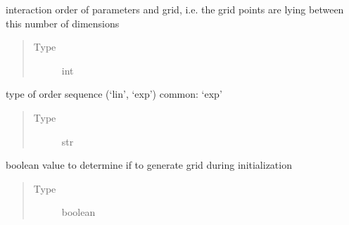 \documentclass[letterpaper,10pt,english,openany,oneside]{sphinxmanual}
\begin{document}
\begin{fulllineitems}
\begin{fulllineitems}
\begin{quote}
\begin{description}
\end{description}\end{quote}

\end{fulllineitems}


\begin{fulllineitems}
\label{\detokenize{pygpc:pygpc.grid.SparseGrid.interaction_order}}
interaction order of parameters and grid, i.e. the grid points are lying between this number of dimensions
\begin{quote}\begin{description}
\item[{Type}] \leavevmode
int

\end{description}\end{quote}

\end{fulllineitems}


\begin{fulllineitems}
\label{\detokenize{pygpc:pygpc.grid.SparseGrid.order_sequence_type}}
type of order sequence (‘lin’, ‘exp’) common: ‘exp’
\begin{quote}\begin{description}
\item[{Type}] \leavevmode
str

\end{description}\end{quote}

\end{fulllineitems}


\begin{fulllineitems}
\label{\detokenize{pygpc:pygpc.grid.SparseGrid.make_grid}}
boolean value to determine if to generate grid during initialization
\begin{quote}\begin{description}
\item[{Type}] \leavevmode
boolean

\end{description}\end{quote}


\end{fulllineitems}
\end{fulllineitems}
\end{document}
